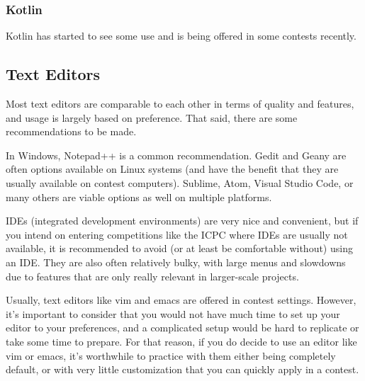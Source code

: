 \subsubsection{Kotlin}

Kotlin has started to see some use and is being offered in some contests recently.

\subsection{Text Editors}

Most text editors are comparable to each other in terms of quality and features, and usage is largely based on preference. That said, there are some recommendations to be made.

In Windows, Notepad++ is a common recommendation. Gedit and Geany are often options available on Linux systems (and have the benefit that they are usually available on contest computers). Sublime, Atom, Visual Studio Code, or many others are viable options as well on multiple platforms.

IDEs (integrated development environments) are very nice and convenient, but if you intend on entering competitions like the ICPC where IDEs are usually not available, it is recommended to avoid (or at least be comfortable without) using an IDE. They are also often relatively bulky, with large menus and slowdowns due to features that are only really relevant in larger-scale projects.

Usually, text editors like vim and emacs are offered in contest settings. However, it's important to consider that you would not have much time to set up your editor to your preferences, and a complicated setup would be hard to replicate or take some time to prepare. For that reason, if you do decide to use an editor like vim or emacs, it's worthwhile to practice with them either being completely default, or with very little customization that you can quickly apply in a contest.